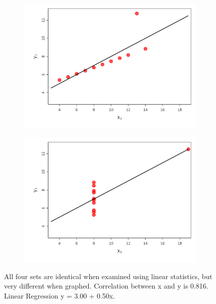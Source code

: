 \documentclass[a4paper,12pt]{article}
\begin{document}
\begin{figure}[H]
\begin{subfigure}[c]{0.49\textwidth}
  \end{subfigure}\\
		\begin{subfigure}[c]{0.49\textwidth}
 \centering
\includegraphics[width=1\textwidth]{figures/Anscombe_data3}
					
  \end{subfigure}%
	\begin{subfigure}[c]{0.49\textwidth}
 \centering
\includegraphics[width=1\textwidth]{figures/Anscombe_data4}
							
  \end{subfigure}
 	\caption{ All four sets are identical when examined using linear statistics, but very different when graphed. Correlation between x and y is 0.816. Linear Regression y = 3.00 + 0.50x.}

\end{figure}
\end{document}
